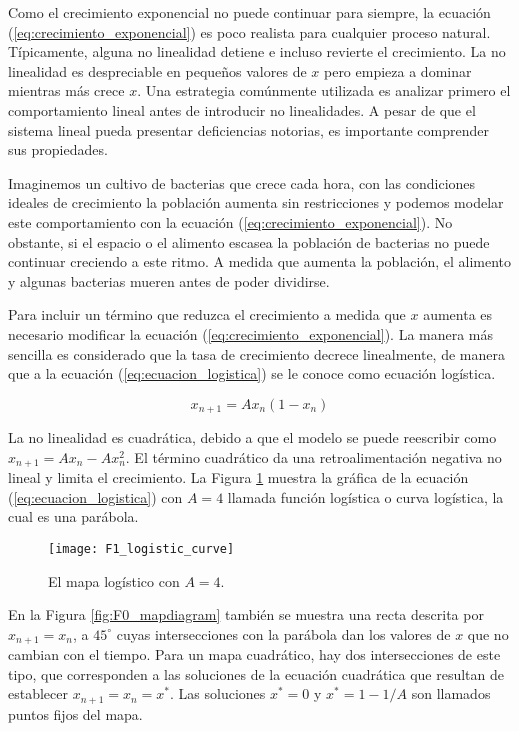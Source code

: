         Como el crecimiento exponencial no puede continuar para siempre, la ecuación (\ref{eq:crecimiento_exponencial}) es poco realista para cualquier proceso natural. Típicamente, alguna no linealidad detiene e incluso revierte el crecimiento. La no linealidad es despreciable en pequeños valores de $x$ pero empieza a dominar mientras más crece $x$. Una estrategia comúnmente utilizada es analizar primero el comportamiento lineal antes de introducir no linealidades. A pesar de que el sistema lineal pueda presentar deficiencias notorias, es importante comprender sus propiedades. 

        Imaginemos un cultivo de bacterias que crece cada hora, con las condiciones ideales de crecimiento la población aumenta sin restricciones y podemos modelar este comportamiento con la ecuación (\ref{eq:crecimiento_exponencial}). No obstante, si el espacio o el alimento escasea la población de bacterias no puede continuar creciendo a este ritmo. A medida que aumenta la población, el alimento y algunas bacterias mueren antes de poder dividirse. 

        Para incluir un término que reduzca el crecimiento a medida que $x$ aumenta es necesario modificar la ecuación (\ref{eq:crecimiento_exponencial}). La manera más sencilla es considerado que la tasa de crecimiento decrece linealmente, de manera que a la ecuación (\ref{eq:ecuacion_logistica}) se le conoce como ecuación logística.
            
       \begin{equation}
            x_{n+1} = A x_{n} (1 - x_{n}) 
            \label{eq:ecuacion_logistica}
       \end{equation}

       La no linealidad es cuadrática, debido a que el modelo se puede reescribir como $x_{n+1} = A x_{n} - A x_{n}^{2}$. El término cuadrático da una retroalimentación negativa no lineal y limita el crecimiento. La Figura \ref{fig:F1_logistic_curve} muestra la gráfica de la ecuación (\ref{eq:ecuacion_logistica}) con $A = 4$ llamada función logística o curva logística, la cual es una parábola.


        \begin{figure}[hbtp]
            \caption{El mapa logístico con $A = 4$.}
            \centering
            \texttt{[image: F1\_logistic\_curve]}
            \label{fig:F1_logistic_curve}
        \end{figure}

        En la Figura \ref{fig:F0_mapdiagram} también se muestra una recta descrita por $x_{n+1} = x_{n}$, a $45^{\circ}$ cuyas intersecciones con la parábola dan los valores de $x$ que no cambian con el tiempo. Para un mapa cuadrático, hay dos intersecciones de este tipo, que corresponden a las soluciones de la ecuación cuadrática que resultan de establecer $x_{n+1} = x_{n} = x^{*}$. Las soluciones $x^{*} = 0$ y $x^{*} = 1 - 1/A$ son llamados puntos fijos del mapa.

